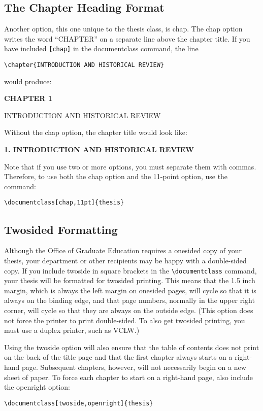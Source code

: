 \documentclass[letterpaper,11pt]{article}
\begin{document}
\subsection{The Chapter Heading Format}


Another option, this one unique to the thesis class, is chap. The chap option writes the word
``CHAPTER'' on a separate line above the chapter title. If you have included \verb|[chap]| in the
documentclass command, the line
\begin{verbatim}
\chapter{INTRODUCTION AND HISTORICAL REVIEW}
\end{verbatim}
would produce:
\begin{center}
  {\large\bf CHAPTER 1
    
  INTRODUCTION AND HISTORICAL REVIEW
  }
\end{center}
Without the chap option, the chapter title would look like:
\begin{center}
  {\large\bf 1. INTRODUCTION AND HISTORICAL REVIEW}
\end{center}
Note that if you use two or more options, you must separate them with commas. Therefore,
to use both the chap option and the 11-point option, use the command:
\begin{verbatim}
\documentclass[chap,11pt]{thesis}
\end{verbatim}


\subsection{Twosided Formatting}

Although the Office of Graduate Education requires a onesided copy of your thesis, your
department or other recipients may be happy with a double-sided copy. If you include twoside
in square brackets in the \verb|\documentclass| command, your thesis will be formatted for twosided
printing. This means that the 1.5 inch margin, which is always the left margin on onesided
pages, will cycle so that it is always on the binding edge, and that page numbers, normally in
the upper right corner, will cycle so that they are always on the outside edge. (This option
does not force the printer to print double-sided. To also get twosided printing, you must use a
duplex printer, such as VCLW.)

Using the twoside option will also ensure that the table of contents does not print on the back
of the title page and that the first chapter always starts on a right-hand page. Subsequent
chapters, however, will not necessarily begin on a new sheet of paper. To force each chapter
to start on a right-hand page, also include the openright option:
\begin{verbatim}
\documentclass[twoside,openright]{thesis}
\end{verbatim}
\end{document}
